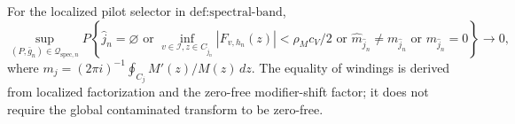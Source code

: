 For the localized pilot selector in \(\text{def:spectral-band}\),
\[
 \sup_{(P,\bar g_n)\in\mathcal Q_{\mathrm{spec},n}}
 P\left\{\widehat j_n=\varnothing\text{ or }
 \inf_{v\in\mathcal I,z\in C_{\widehat j_n}}|F_{v,h_n}(z)|<\rho_Mc_V/2
 \text{ or }\widehat m_{\widehat j_n}\ne m_{\widehat j_n}
 \text{ or }m_{\widehat j_n}=0\right\}\longrightarrow0,
\]
where \(m_j=(2\pi i)^{-1}\oint_{C_j}M'(z)/M(z)\,dz\).  The equality of windings is derived from localized factorization and the zero-free modifier-shift factor; it does not require the global contaminated transform to be zero-free.